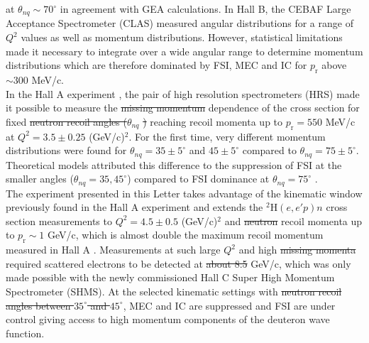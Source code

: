 \documentclass[aps,prl,twocolumn,showpacs,superscriptaddress,groupedaddress]{revtex4-2}  %
\providecommand{\DIFaddtex}[1]{{\protect\color{blue}\uwave{#1}}} %
\providecommand{\DIFdeltex}[1]{{\protect\color{red}\sout{#1}}}                      %
\providecommand{\DIFaddbegin}{} %
\providecommand{\DIFaddend}{} %
\providecommand{\DIFdelbegin}{} %
\providecommand{\DIFdelend}{} %
\providecommand{\DIFadd}[1]{\texorpdfstring{\DIFaddtex{#1}}{#1}} %
\providecommand{\DIFdel}[1]{\texorpdfstring{\DIFdeltex{#1}}{}} %
\newcommand{\DIFscaledelfig}{0.5}
\newlength{\DIFdelgraphicswidth} %
\newlength{\DIFdelgraphicsheight} %
\newcommand{\DIFaddincludegraphics}[2][]{{\color{blue}\fbox{\DIFOincludegraphics[#1]{#2}}}} %
\newcommand{\DIFdelincludegraphics}[2][]{%
\sbox{\DIFdelgraphicsbox}{\DIFOincludegraphics[#1]{#2}}%
\settoboxwidth{\DIFdelgraphicswidth}{\DIFdelgraphicsbox} %
\settoboxtotalheight{\DIFdelgraphicsheight}{\DIFdelgraphicsbox} %
\scalebox{\DIFscaledelfig}{%
\parbox[b]{\DIFdelgraphicswidth}{\usebox{\DIFdelgraphicsbox}\\[-\baselineskip] \rule{\DIFdelgraphicswidth}{0em}}\llap{\resizebox{\DIFdelgraphicswidth}{\DIFdelgraphicsheight}{%
\setlength{\unitlength}{\DIFdelgraphicswidth}%
\begin{picture}(1,1)%
\thicklines\linethickness{2pt} %
{\color[rgb]{1,0,0}\put(0,0){\framebox(1,1){}}}%
{\color[rgb]{1,0,0}\put(0,0){\line( 1,1){1}}}%
{\color[rgb]{1,0,0}\put(0,1){\line(1,-1){1}}}%
\end{picture}%
}\hspace*{3pt}}} %
} %
\DeclareRobustCommand{\DIFaddbegin}{\DIFOaddbegin \let\includegraphics\DIFaddincludegraphics} %
\DeclareRobustCommand{\DIFaddend}{\DIFOaddend \let\includegraphics\DIFOincludegraphics} %
\DeclareRobustCommand{\DIFdelbegin}{\DIFOdelbegin \let\includegraphics\DIFdelincludegraphics} %
\DeclareRobustCommand{\DIFdelend}{\DIFOaddend \let\includegraphics\DIFOincludegraphics} %
\begin{document}
at $\theta_{nq} \sim 70^{\circ}$ in agreement with GEA \cite{Sargsian_2001,PhysRevC.56.1124} calculations. In Hall B, the CEBAF Large Acceptance Spectrometer (CLAS) measured angular
distributions for a range of $Q^2$ values as well as momentum distributions. However, statistical limitations made it necessary to integrate over a wide angular range to determine momentum distributions
which are therefore dominated by  FSI, MEC and IC for $p_{\mathrm{r}}$ above $\sim 300$ MeV/c. \\
\indent In the Hall A experiment \cite{PhysRevLett.107.262501}, the pair of high resolution spectrometers (HRS) made it possible to measure the \DIFdelbegin \DIFdel{missing momentum }\DIFdelend \DIFaddbegin \DIFadd{$p_{\mathrm{r}}$ }\DIFaddend dependence of the cross section for fixed \DIFdelbegin \DIFdel{neutron recoil angles (}\DIFdelend $\theta_{nq}$
\DIFdelbegin \DIFdel{)
}\DIFdelend reaching recoil momenta up to $p_{\mathrm{r}}=550$ MeV/c at $Q^{2}=3.5\pm0.25$ (GeV/c)$^{2}$. For the first time, very different momentum distributions were found for $\theta_{nq}=35\pm5^{\circ}$
and $45\pm5^{\circ}$ compared to  $\theta_{nq}=75\pm5^{\circ}$. Theoretical models attributed this difference  to the suppression of FSI at the smaller angles ($\theta_{nq}=35, 45^{\circ}$) compared to FSI
dominance at $\theta_{nq}=75^{\circ}$ \cite{PhysRevLett.107.262501}. \\
\indent The experiment presented in this Letter takes advantage of the kinematic window previously found in the Hall A experiment \cite{PhysRevLett.107.262501} and extends the $^{2}\mathrm{H}(e,e'p)n$ cross section measurements
to $Q^{2}=4.5\pm0.5$ (GeV/c)$^{2}$ and \DIFdelbegin \DIFdel{neutron }\DIFdelend recoil momenta up to $p_{\mathrm{r}}\sim 1$ GeV/c, which is almost double the maximum recoil momentum measured in Hall A \cite{PhysRevLett.107.262501}.
Measurements at such large $Q^{2}$ and high \DIFdelbegin \DIFdel{missing momenta }\DIFdelend \DIFaddbegin \DIFadd{$p_{\mathrm{r}}$ }\DIFaddend required scattered electrons to be detected at \DIFdelbegin \DIFdel{about 8.5 }\DIFdelend \DIFaddbegin \DIFadd{$\sim 8.5$ }\DIFaddend GeV/c, which was only made possible with the newly commissioned Hall C Super High Momentum Spectrometer (SHMS).
At the selected kinematic settings with \DIFdelbegin \DIFdel{neutron recoil angles between $35^{\circ}$ and $45^{\circ}$}\DIFdelend \DIFaddbegin \DIFadd{$35^{\circ} \leq \theta_{nq} \leq45^{\circ}$}\DIFaddend , MEC and IC are suppressed and FSI are under control giving access to high momentum components of the deuteron wave function.\\
\end{document}
